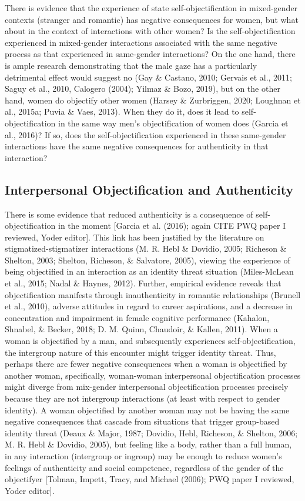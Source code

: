 \documentclass[man]{apa6}
\begin{document}
There is evidence that the experience of state self-objectification in
mixed-gender contexts (stranger and romantic) has negative consequences
for women, but what about in the context of interactions with other
women? Is the self-objectification experienced in mixed-gender
interactions associated with the same negative process as that
experienced in same-gender interactions? On the one hand, there is ample
research demonstrating that the male gaze has a particularly detrimental
effect would suggest no (Gay \& Castano, 2010; Gervais et al., 2011;
Saguy et al., 2010, Calogero (2004); Yilmaz \& Bozo, 2019), but on the
other hand, women do objectify other women (Harsey \& Zurbriggen, 2020;
Loughnan et al., 2015a; Puvia \& Vaes, 2013). When they do it, does it
lead to self-objectification in the same way men's objectification of
women does (Garcia et al., 2016)? If so, does the self-objectification
experienced in these same-gender interactions have the same negative
consequences for authenticity in that interaction?

\subsection{Interpersonal Objectification and
Authenticity}\label{interpersonal-objectification-and-authenticity}

There is some evidence that reduced authenticity is a consequence of
self-objectification in the moment {[}Garcia et al. (2016); again CITE
PWQ paper I reviewed, Yoder editor{]}. This link has been justified by
the literature on stigmatized-stigmatizer interactions (M. R. Hebl \&
Dovidio, 2005; Richeson \& Shelton, 2003; Shelton, Richeson, \&
Salvatore, 2005), viewing the experience of being objectified in an
interaction as an identity threat situation (Miles-McLean et al., 2015;
Nadal \& Haynes, 2012). Further, empirical evidence reveals that
objectification manifests through inauthenticity in romantic
relationships (Brunell et al., 2010), adverse attitudes in regard to
career aspirations, and a decrease in concentration and impairment in
female cognitive performance (Kahalon, Shnabel, \& Becker, 2018; D. M.
Quinn, Chaudoir, \& Kallen, 2011). When a woman is objectified by a man,
and subsequently experiences self-objectification, the intergroup nature
of this encounter might trigger identity threat. Thus, perhaps there are
fewer negative consequences when a woman is objectified by another
woman, specifically, woman-woman interpersonal objectification processes
might diverge from mix-gender interpersonal objectification processes
precisely because they are not intergroup interactions (at least with
respect to gender identity). A woman objectified by another woman may
not be having the same negative consequences that cascade from
situations that trigger group-based identity threat (Deaux \& Major,
1987; Dovidio, Hebl, Richeson, \& Shelton, 2006; M. R. Hebl \& Dovidio,
2005), but feeling like a body, rather than a full human, in any
interaction (intergroup or ingroup) may be enough to reduce women's
feelings of authenticity and social competence, regardless of the gender
of the objectifyer {[}Tolman, Impett, Tracy, and Michael (2006); PWQ
paper I reviewed, Yoder editor{]}.
\end{document}
